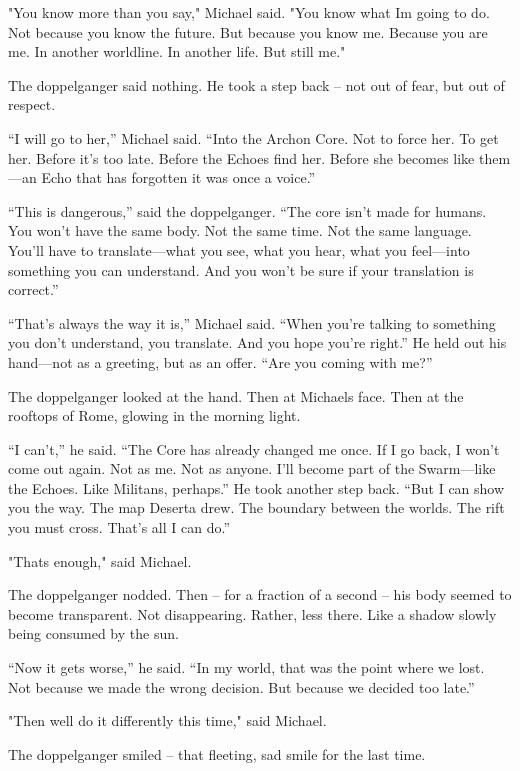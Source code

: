 \documentclass[
]{article}
\begin{document}
"You know more than you say," Michael said. "You know what I\textquotesingle m going to do. Not because you know the future. But because you know me. Because you are me. In another worldline. In another life. But still me."

The doppelganger said nothing. He took a step back -- not out of fear, but out of respect.

``I will go to her,'' Michael said. ``Into the Archon Core. Not to force her. To get her. Before it's too late. Before the Echoes find her. Before she becomes like them---an Echo that has forgotten it was once a voice.''

``This is dangerous,'' said the doppelganger. ``The core isn't made for humans. You won't have the same body. Not the same time. Not the same language. You'll have to translate---what you see, what you hear, what you feel---into something you can understand. And you won't be sure if your translation is correct.''

``That's always the way it is,'' Michael said. ``When you're talking to something you don't understand, you translate. And you hope you're right.'' He held out his hand---not as a greeting, but as an offer. ``Are you coming with me?''

The doppelganger looked at the hand. Then at Michael\textquotesingle s face. Then at the rooftops of Rome, glowing in the morning light.

``I can't,'' he said. ``The Core has already changed me once. If I go back, I won't come out again. Not as me. Not as anyone. I'll become part of the Swarm---like the Echoes. Like Militans, perhaps.'' He took another step back. ``But I can show you the way. The map Deserta drew. The boundary between the worlds. The rift you must cross. That's all I can do.''

"That\textquotesingle s enough," said Michael.

The doppelganger nodded. Then -- for a fraction of a second -- his body seemed to become transparent. Not disappearing. Rather, less there. Like a shadow slowly being consumed by the sun.

``Now it gets worse,'' he said. ``In my world, that was the point where we lost. Not because we made the wrong decision. But because we decided too late.''

"Then we\textquotesingle ll do it differently this time," said Michael.

The doppelganger smiled -- that fleeting, sad smile for the last time.
\end{document}
